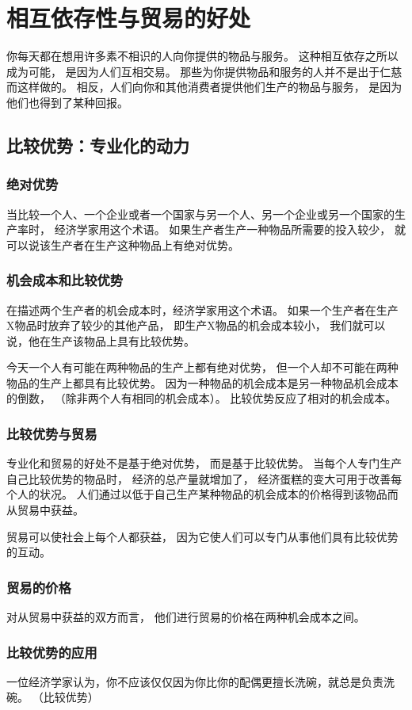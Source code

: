 
\chapter{相互依存性与贸易的好处}

你每天都在想用许多素不相识的人向你提供的物品与服务。
这种相互依存之所以成为可能，
是因为人们互相交易。
那些为你提供物品和服务的人并不是出于仁慈而这样做的。
相反，人们向你和其他消费者提供他们生产的物品与服务，
是因为他们也得到了某种回报。




\section{比较优势：专业化的动力}

\subsection{绝对优势}


当比较一个人、一个企业或者一个国家与另一个人、另一个企业或另一个国家的生产率时，
经济学家用这个术语。
如果生产者生产一种物品所需要的投入较少，
就可以说该生产者在生产这种物品上有绝对优势。


\subsection{机会成本和比较优势}



在描述两个生产者的机会成本时，经济学家用这个术语。
如果一个生产者在生产X物品时放弃了较少的其他产品，
即生产X物品的机会成本较小，
我们就可以说，他在生产该物品上具有比较优势。


今天一个人有可能在两种物品的生产上都有绝对优势，
但一个人却不可能在两种物品的生产上都具有比较优势。
因为一种物品的机会成本是另一种物品机会成本的倒数，
（除非两个人有相同的机会成本）。
比较优势反应了相对的机会成本。


\subsection{比较优势与贸易}

专业化和贸易的好处不是基于绝对优势，
而是基于比较优势。
当每个人专门生产自己比较优势的物品时，
经济的总产量就增加了，
经济蛋糕的变大可用于改善每个人的状况。
人们通过以低于自己生产某种物品的机会成本的价格得到该物品而从贸易中获益。



贸易可以使社会上每个人都获益，
因为它使人们可以专门从事他们具有比较优势的互动。


\subsection{贸易的价格}

对从贸易中获益的双方而言，
他们进行贸易的价格在两种机会成本之间。


\subsection{比较优势的应用}


一位经济学家认为，你不应该仅仅因为你比你的配偶更擅长洗碗，就总是负责洗碗。
（比较优势）


